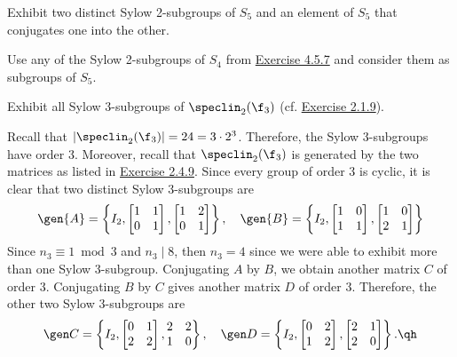 \begin{exercise}\label{ex4.5.8}
	Exhibit two distinct Sylow 2-subgroups of $S_5$ and an element of $S_5$ that conjugates one into the other.
\end{exercise}

\begin{sol}
	Use any of the Sylow 2-subgroups of $S_4$ from \hyperref[ex4.5.7]{Exercise 4.5.7} and consider them as subgroups of $S_5$.
\end{sol}

\newpage

\begin{exercise}\label{ex4.5.9}
	Exhibit all Sylow 3-subgroups of $\speclin_2(\f_3)$ (cf. \hyperref[ex2.1.9]{Exercise 2.1.9}).
\end{exercise}

\begin{sol}
	Recall that $|\speclin_2(\f_3)| = 24 = 3 \cdot 2^3$. Therefore, the Sylow 3-subgroups have order 3. Moreover, recall that $\speclin_2(\f_3)$ is generated by the two matrices as listed in \hyperref[ex2.4.9]{Exercise 2.4.9}. Since every group of order 3 is cyclic, it is clear that two distinct Sylow 3-subgroups are
	\[
	\gen{A} = \left\{I_2,
	\begin{bmatrix}
		1 & 1 \\
		0 & 1
	\end{bmatrix},
	\begin{bmatrix}
		1 & 2 \\
		0 & 1
	\end{bmatrix} \right\}, \quad
	\gen{B} = \left\{I_2, 
	\begin{bmatrix}
		1 & 0 \\
		1 & 1
	\end{bmatrix}, 
	\begin{bmatrix}
		1 & 0 \\
		2 & 1
	\end{bmatrix} \right\}\] 
	Since $n_3 \equiv 1 \bmod 3$ and $n_3 \mid 8$, then $n_3 = 4$ since we were able to exhibit more than one Sylow 3-subgroup. Conjugating $A$ by $B$, we obtain another matrix $C$ of order 3. Conjugating $B$ by $C$ gives another matrix $D$ of order 3. Therefore, the other two Sylow 3-subgroups are 
	\[\gen C = \left\{I_2, 
	\begin{bmatrix}
		0 & 1 \\
		2 & 2
	\end{bmatrix}, 
	\begin{matrix}
		2 & 2 \\
		1 & 0
	\end{matrix} \right\}, \quad
	\gen D = \left\{I_2,
	\begin{bmatrix}
		0 & 2 \\
		1 & 2
	\end{bmatrix}, 
	\begin{bmatrix}
		2 & 1 \\
		2 & 0
	\end{bmatrix} \right\}. \qh\]
\end{sol}


